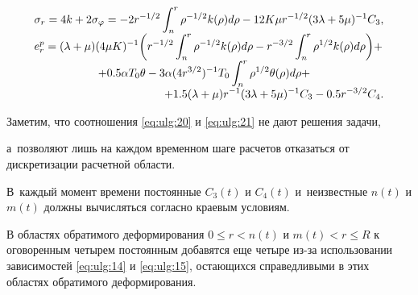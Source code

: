 \begin{equation} 

\label{eq:ulg:21} 

\begin{array}{l} 

\displaystyle

\sigma _{r} =4k + 2\sigma _{\varphi } =-2r^{-1/2} \int _{n}^{r} \rho ^{-1/2} k(\rho )d\rho  -12K\mu r^{-1/2} (3\lambda +5\mu )^{-1} C_{3} , 

\\[2mm] 

\displaystyle

e_{r}^{p} = (\lambda +\mu ) (4\mu K)^{-1} 

\biggl(

 r^{-1/2} \int _{n}^{r}\rho ^{-1/2} k(\rho )d\rho  

-r^{-3/2} \int _{n}^{r}\rho ^{1/2} k(\rho )d\rho  \biggr)+ 

\\[2mm] 

\hspace{2cm}

\displaystyle

+0.5\alpha T_{0} \theta -3\alpha (4r^{3/2} )^{-1} T_{0} 

\int _{n}^{r}\rho ^{1/2} \theta (\rho )d\rho  + 

\\[2mm]

\hfill

\displaystyle

+1.5(\lambda +\mu )r^{-1} (3\lambda +5\mu )^{-1} C_{3} -0.5r^{-3/2} C_{4} . 

\end{array} 

\end{equation} 



Заметим, что соотношения \eqref{eq:ulg:20} и \eqref{eq:ulg:21} не дают решения задачи, 

а~позволяют лишь на каждом временном шаге расчетов отказаться от дискретизации расчетной области. 

В~каждый момент времени постоянные $C_{3} (t)$ и $C_{4} (t)$ и~неизвестные $n(t)$  и $m(t)$  должны вычисляться  согласно краевым условиям. 

В областях обратимого деформирования $0\le r<n(t)$ и $m(t)<r\le R$ к оговоренным четырем постоянным добавятся еще четыре из-за использовании зависимостей \eqref{eq:ulg:14} и \eqref{eq:ulg:15}, остающихся справедливыми в этих областях обратимого деформирования.  

